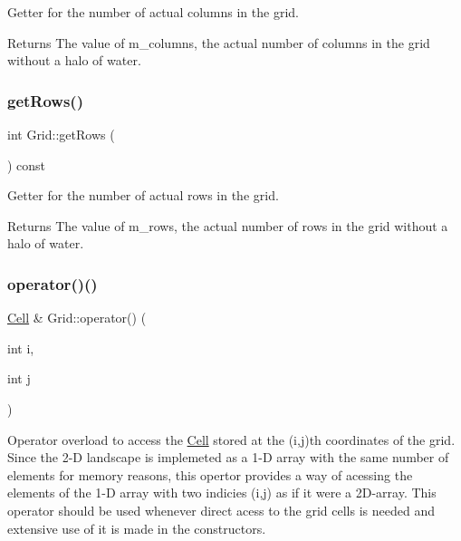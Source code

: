 Getter for the number of actual columns in the grid. 

\begin{DoxyReturn}{Returns}
The value of m\+\_\+columns, the actual number of columns in the grid without a halo of water. 
\end{DoxyReturn}
\mbox{\label{class_grid_aa9397afb775457f87b9096acf6082383}} 
\subsubsection{\texorpdfstring{get\+Rows()}{getRows()}}
{\footnotesize\ttfamily int Grid\+::get\+Rows (\begin{DoxyParamCaption}{ }\end{DoxyParamCaption}) const}



Getter for the number of actual rows in the grid. 

\begin{DoxyReturn}{Returns}
The value of m\+\_\+rows, the actual number of rows in the grid without a halo of water. 
\end{DoxyReturn}
\mbox{\label{class_grid_aed06be122077b3a0c1fe7c412c2535fc}} 
\subsubsection{\texorpdfstring{operator()()}{operator()()}\hspace{0.1cm}{\footnotesize\ttfamily [1/2]}}
{\footnotesize\ttfamily \hyperlink{class_cell}{Cell} \& Grid\+::operator() (\begin{DoxyParamCaption}\item[{int}]{i,  }\item[{int}]{j }\end{DoxyParamCaption})}

Operator overload to access the \hyperlink{class_cell}{Cell} stored at the (i,j)th coordinates of the grid. Since the 2-\/D landscape is implemeted as a 1-\/D array with the same number of elements for memory reasons, this opertor provides a way of acessing the elements of the 1-\/D array with two indicies (i,j) as if it were a 2\+D-\/array. This operator should be used whenever direct acess to the grid cells is needed and extensive use of it is made in the constructors.

